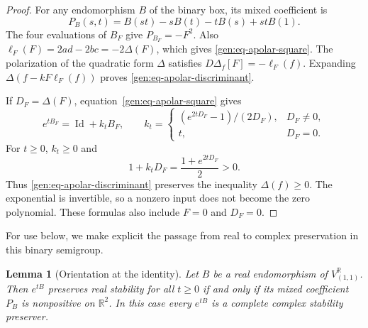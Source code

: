 \documentclass[reqno]{amsart}
\newtheorem{lemma}[theorem]{Lemma}
\theoremstyle{definition}
\theoremstyle{remark}
\newcommand{\R}{\mathbb R}
\DeclareMathOperator{\Id}{Id}
\begin{document}
\begin{proof}
For any endomorphism \(B\) of the binary box, its mixed coefficient is
\begin{equation}
 P_B(s,t)=B(st)-sB(t)-tB(s)+stB(1).
 \label{gen:eq-binary-coefficient}
\end{equation}
The four evaluations of \(B_F\) give \(P_{B_F}=-F^2\).
Also
\(\ell_F(F)=2ad-2bc=-2\Delta(F)\), which gives
\eqref{gen:eq-apolar-square}.
The polarization of the quadratic form \(\Delta\) satisfies
\(D\Delta_f[F]=-\ell_F(f)\).  Expanding
\(\Delta(f-kF\ell_F(f))\) proves
\eqref{gen:eq-apolar-discriminant}.

If \(D_F=\Delta(F)\), equation~\eqref{gen:eq-apolar-square} gives
\[
 e^{tB_F}=\Id+k_tB_F,\qquad
 k_t=
 \begin{cases}
 (e^{2tD_F}-1)/(2D_F),&D_F\neq0,\\
 t,&D_F=0.
 \end{cases}
\]
For \(t\geq0\), \(k_t\geq0\) and
\[
 1+k_tD_F=\frac{1+e^{2tD_F}}2>0.
\]
Thus \eqref{gen:eq-apolar-discriminant} preserves the inequality
\(\Delta(f)\geq0\).
The exponential is invertible, so a nonzero input does not become
the zero polynomial.  These formulas also include \(F=0\) and
\(D_F=0\).
\end{proof}

For use below, we make explicit the passage from real to complex
preservation in this binary semigroup.

\begin{lemma}[Orientation at the identity]
\label{gen:binary-completeness}
Let \(B\) be a real endomorphism of \(V_{(1,1)}^\R\).
Then \(e^{tB}\) preserves real stability for all \(t\geq0\) if and
only if its mixed coefficient \(P_B\) is nonpositive on \(\R^2\).
In this case every \(e^{tB}\) is a complete complex stability
preserver.
\end{lemma}
\end{document}
